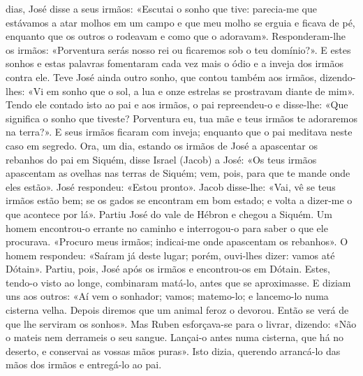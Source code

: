 \begin{paracol}{2}
{ dias, José disse a seus irmãos: «Escutai o sonho que tive: parecia-me que estávamos a atar molhos em um campo e que meu molho se erguia e ficava de pé, enquanto que os outros o rodeavam e como que o adoravam». Responderam-lhe os irmãos: «Porventura serás nosso rei ou ficaremos sob o teu domínio?». E estes sonhos e estas palavras fomentaram cada vez mais o ódio e a inveja dos irmãos contra ele. Teve José ainda outro sonho, que contou também aos irmãos, dizendo-lhes: «Vi em sonho que o sol, a lua e onze estrelas se prostravam diante de mim». Tendo ele contado isto ao pai e aos irmãos, o pai repreendeu-o e disse-lhe: «Que significa o sonho que tiveste? Porventura eu, tua mãe e teus irmãos te adoraremos na terra?». E seus irmãos ficaram com inveja; enquanto que o pai meditava neste caso em segredo. Ora, um dia, estando os irmãos de José a apascentar os rebanhos do pai em Siquém, disse Israel (Jacob) a José: «Os teus irmãos apascentam as ovelhas nas terras de Siquém; vem, pois, para que te mande onde eles estão». José respondeu: «Estou pronto». Jacob disse-lhe: «Vai, vê se teus irmãos estão bem; se os gados se encontram em bom estado; e volta a dizer-me o que acontece por lá». Partiu José do vale de Hébron e chegou a Siquém. Um homem encontrou-o errante no caminho e interrogou-o para saber o que ele procurava. «Procuro meus irmãos; indicai-me onde apascentam os rebanhos». O homem respondeu: «Saíram já deste lugar; porém, ouvi-lhes dizer: vamos até Dótain». Partiu, pois, José após os irmãos e encontrou-os em Dótain. Estes, tendo-o visto ao longe, combinaram matá-lo, antes que se aproximasse. E diziam uns aos outros: «Aí vem o sonhador; vamos; matemo-lo; e lancemo-lo numa cisterna velha. Depois diremos que um animal feroz o devorou. Então se verá de que lhe serviram os sonhos». Mas Ruben esforçava-se para o livrar, dizendo: «Não o mateis nem derrameis o seu sangue. Lançai-o antes numa cisterna, que há no deserto, e conservai as vossas mãos puras». Isto dizia, querendo arrancá-lo das mãos dos irmãos e entregá-lo ao pai.
}\end{paracol}

\begin{paracol}{2}\switchcolumn{}\end{paracol}

